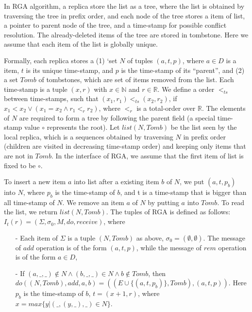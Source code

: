 \begin{example}[RGA]
\label{definition:rga implementation}
In RGA algorithm, a replica store the list as a tree, where the list is obtained by traversing the tree in prefix order, and each node of the tree stores a item of list, a pointer to parent node of the tree, and a time-stamp for possible conflict resolution. The already-deleted items of the tree are stored in tombstone. Here we assume that each item of the list is globally unique.

Formally, each replica stores a (1) `set $N$ of tuples $(a,t,p)$, where $a \in D$ is a item, $t$ is its unique time-stamp, and $p$ is the time-stamp of its ``parent'', and (2) a set $\mathit{Tomb}$ of tombstones, which are set of items removed from the list. Each time-stamp is a tuple $(x,r)$ with $x \in \mathbb{N}$ and $r \in \mathbb{R}$. We define a order $<_{\mathit{ts}}$ between time-stamps, such that $(x_1,r_1) <_{\mathit{ts}} (x_2,r_2)$, if $x_1 < x_2 \vee (x_1 = x_2 \wedge r_1 <_r r_2)$, where $<_r$ is a total-order over $\mathbb{R}$. The elements of $N$ are required to form a tree by following the parent field (a special time-stamp value $\circ$ represents the root). Let $\mathit{list}(N,\mathit{Tomb})$ be the list seen by the local replica, which is a sequences obtained by traversing $N$ in prefix order (children are visited in decreasing time-stamp order) and keeping only items that are not in $\mathit{Tomb}$. In the interface of RGA, we assume that the first item of list is fixed to be $\circ$.

To insert a new item $a$ into list after a existing item $b$ of $N$, we put $(a,t,p_b)$ into $N$, where $p_b$ is the time-stamp of $b$, and t is a time-stamp that is bigger than all time-stamp of $N$. We remove an item $a$ of $N$ by putting $a$ into $\mathit{Tomb}$. To read the list, we return $\mathit{list}(N,\mathit{Tomb})$. The tuples of RGA is defined as follows: $I_t(r) = (\Sigma, \sigma_0, M, \mathit{do},\mathit{receive})$, where

\begin{itemize}
\setlength{\itemsep}{0.5pt}
\item[-] Each item of $\Sigma$ is a tuple $(N,\mathit{Tomb})$ as above, $\sigma_0 = (\emptyset, \emptyset)$. The message of $\mathit{add}$ operation is of the form $(a,t,p)$, while the message of $\mathit{rem}$ operation is of the form $a \in D$,

\item[-] If $(a,\_,\_) \notin N \wedge (b,\_,\_) \in N \wedge b \notin \mathit{Tomb}$, then $\mathit{do}((N,\mathit{Tomb}),\mathit{add},a,b) = ((E \cup \{ (a,t,p_b) \},\mathit{Tomb}),(a,t,p))$. Here $p_b$ is the time-stamp of $b$, $t = (x+1,r)$, where $x = \mathit{max}\{ y \vert (\_,(y,\_),\_) \in N \}$.


\end{itemize}
\end{example}
